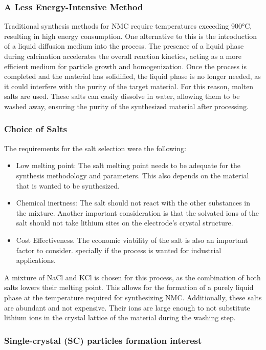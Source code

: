 \documentclass{article}
\begin{document}
{\subsubsection{A Less Energy-Intensive Method}
Traditional synthesis methods for NMC require temperatures exceeding 900°C, resulting in high energy consumption. One alternative to this is the introduction of a liquid diffusion medium into the process. The presence of a liquid phase during calcination accelerates the overall reaction kinetics, acting as a more efficient medium for particle growth and homogenization. Once the process is completed and the material has solidified, the liquid phase is no longer needed, as it could interfere with the purity of the target material. For this reason, molten salts are used. These salts can easily dissolve in water, allowing them to be washed away, ensuring the purity of the synthesized material after processing.\cite{Heuristics}

\subsubsection{Choice of Salts}
The requirements for the salt selection were the following:
\begin {itemize}
\item Low melting point: The salt melting point needs to be adequate 
for the synthesis methodology and parameters. This also depends on the material
that is wanted to be synthesized.
\item Chemical inertness: The salt should not react with the other substances in the mixture. 
Another important consideration is that the solvated ions of the salt should not take lithium sites on 
the electrode's crystal structure.
\item Cost Effectiveness. The economic viability of the salt is also an important factor to consider.
specially if the process is wanted for industrial applications. 
\end{itemize}
A mixture of NaCl and KCl is chosen for this process, as the combination of both salts lowers their melting point. This allows for the formation of a purely liquid phase at the temperature required for synthesizing NMC. Additionally, these salts are abundant and not expensive. Their ions are  large enough to not substitute lithium ions in the crystal lattice of the material during the washing step. \cite{Heuristics} \\

\subsubsection{Single-crystal (SC) particles formation interest}

}
\end{document}
